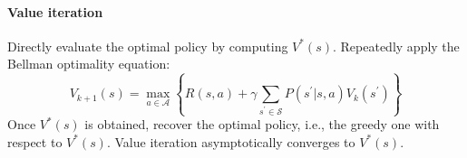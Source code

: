 \paragraph*{Value iteration}
Directly evaluate the optimal policy by computing $V^\ast(s)$.
Repeatedly apply the Bellman optimality equation:
\[V_{k+1}(s) = \max_{a\in\mathcal{A}}\left\{R(s, a) + \gamma\sum_{s^\prime\in\mathcal{S}}P(s^\prime|s, a)V_k(s^\prime)\right\}\]
Once $V^\ast(s)$ is obtained, recover the optimal policy, i.e., the greedy one with respect to $V^\ast(s)$.
Value iteration asymptotically converges to $V^\ast(s)$.